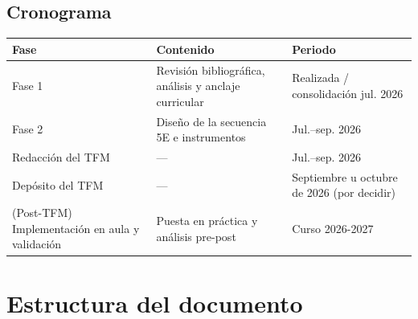 \subsection{Cronograma}

\begin{table}[ht]
\centering
\begin{tabularx}{\textwidth}{|>{\raggedright\arraybackslash}p{2.6cm}|>{\raggedright\arraybackslash}X|>{\raggedright\arraybackslash}p{3.6cm}|} \hline
\rowcolor{naranja}
{\color{white}\textbf{Fase}} & {\color{white}\textbf{Contenido}} & {\color{white}\textbf{Periodo}} \\ \hline
Fase 1 & Revisión bibliográfica, análisis y anclaje curricular & Realizada / consolidación jul. 2026 \\ \hline
Fase 2 & Diseño de la secuencia 5E e instrumentos & Jul.--sep. 2026 \\ \hline
Redacción del TFM & --- & Jul.--sep. 2026 \\ \hline
Depósito del TFM & --- & Septiembre u octubre de 2026 (por decidir) \\ \hline
(Post-TFM) Implementación en aula y validación & Puesta en práctica y análisis pre-post & Curso 2026-2027 \\ \hline
\end{tabularx}
\end{table}

\section{Estructura del documento}\label{sec:estructura}

